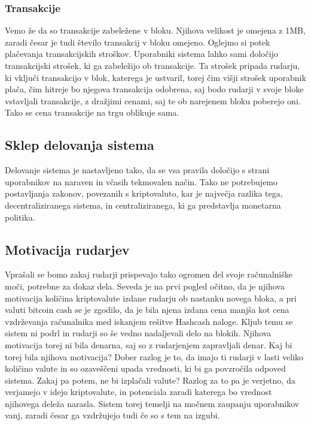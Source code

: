 \documentclass[letterpaper, titlepage, freqn]{article}
\begin{document}
\subsubsection{Transakcije}

Vemo že da so transakcije zabeležene v bloku. Njihova velikost je omejena z 1MB, zaradi česar je tudi število transakcij v bloku omejeno. Oglejmo si potek plačevanja transakcijskih stroškov.
Uporabniki sistema lahko sami določijo transakcijski strošek, ki ga zabeležijo ob transakcije. Ta strošek pripada rudarju, ki vključi transakcijo v blok, katerega je ustvaril, torej čim višji strošek uporabnik plača, čim hitreje bo njegova transakcija odobrena, saj bodo rudarji v svoje bloke vstavljali transakcije, z dražjimi cenami, saj te ob narejenem bloku poberejo oni.
Tako se cena transakcije na trgu oblikuje sama.\\

\subsection{Sklep delovanja sistema}

Delovanje sistema je nastavljeno tako, da se vsa pravila določijo s strani uporabnikov na naraven in včasih tekmovalen način. Tako ne potrebujemo postavljanja zakonov, povezanih s kriptovaluto, kar je največja razlika tega, decentraliziranega sistema, in centraliziranega, ki ga predstavlja monetarna politika.\\

\subsection{Motivacija rudarjev}

Vprašali se bomo zakaj rudarji prispevajo tako ogromen del svoje računalniške moči, potrebne za dokaz dela. Seveda je na prvi pogled očitno, da je njihova motivacija količina kriptovalute izdane rudarju ob nastanku novega bloka, a pri valuti bitcoin cash se je zgodilo, da je bila njena izdana cena manjša kot cena vzdrževanja računalnika med iskanjem rešitve Hashcash naloge. Kljub temu se sistem ni podrl in rudarji so še vedno nadaljevali delo na blokih. Njihova motivacija torej ni bila denarna, saj so z rudarjenjem zapravljali denar. Kaj bi torej bila njihova motivacija? Dober razlog je to, da imajo ti rudarji v lasti veliko količino valute in so ozaveščeni upada vrednosti, ki bi ga povzročila odpoved sistema. Zakaj pa potem, ne bi izplačali valute? Razlog za to pa je verjetno, da verjamejo v idejo kriptovalute, in potenciala zaradi katerega bo vrednost njihovega deleža narasla. Sistem torej temelji na močnem zaupanju uporabnikov vanj, zaradi česar ga vzdržujejo tudi če so s tem na izgubi.\\
\end{document}

